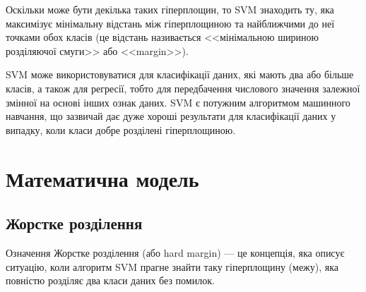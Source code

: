 \documentclass[]{article}
\begin{document}
Оскільки може бути декілька таких гіперплощин, то SVM знаходить ту, яка максимізує мінімальну відстань між гіперплощиною та найближчими до неї точками обох класів (це відстань називається <<мінімальною шириною розділяючої смуги>> або <<margin>>).

SVM може використовуватися для класифікації даних, які мають два або більше класів, а також для регресії, тобто для передбачення числового значення залежної змінної на основі інших ознак даних. SVM є потужним алгоритмом машинного навчання, що зазвичай дає дуже хороші результати для класифікації даних у випадку, коли класи добре розділені гіперплощиною.

\section{Математична модель}

\subsection{Жорстке розділення}

\begin{defbox}{Означення}
Жорстке розділення (або hard margin) --- це концепція, яка описує ситуацію, коли алгоритм SVM прагне знайти таку гіперплощину (межу), яка повністю розділяє два класи даних без помилок.
\end{defbox}
\end{document}
